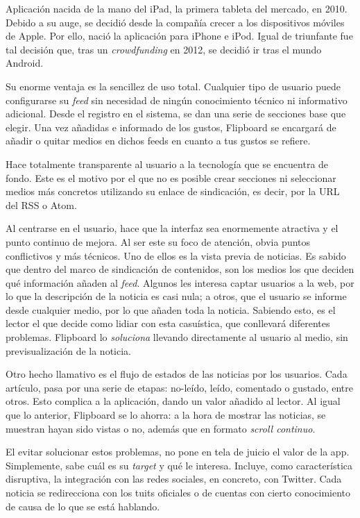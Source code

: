 Aplicación nacida de la mano del iPad, la primera tableta del mercado, en 2010. Debido a su auge, se decidió desde la compañía crecer a los dispositivos móviles de Apple. Por ello, nació la aplicación para iPhone e iPod. Igual de triunfante fue tal decisión que, tras un \textit{crowdfunding} en 2012, se decidió ir tras el mundo Android.


Su enorme ventaja es la sencillez de uso total. Cualquier tipo de usuario puede configurarse su \textit{feed} sin necesidad de ningún conocimiento técnico ni informativo adicional. Desde el registro en el sistema, se dan una serie de secciones base que elegir. Una vez añadidas e informado de los gustos, Flipboard se encargará de añadir o quitar medios en dichos feeds en cuanto a tus gustos se refiere.

Hace totalmente transparente al usuario a la tecnología que se encuentra de fondo. Este es el motivo por el que no es posible crear secciones ni seleccionar medios más concretos utilizando su enlace de sindicación, es decir, por la URL del RSS o Atom.

Al centrarse en el usuario, hace que la interfaz sea enormemente atractiva y el punto continuo de mejora. Al ser este su foco de atención, obvia puntos conflictivos y más técnicos. Uno de ellos es la vista previa de noticias. Es sabido que dentro del marco de sindicación de contenidos, son los medios los que deciden qué información añaden al \textit{feed}. Algunos les interesa captar usuarios a la web, por lo que la descripción de la noticia es casi nula; a otros, que el usuario se informe desde cualquier medio, por lo que añaden toda la noticia. Sabiendo esto, es el lector el que decide como lidiar con esta casuística, que conllevará diferentes problemas. Flipboard lo \textit{soluciona} llevando directamente al usuario al medio, sin previsualización de la noticia.

Otro hecho llamativo es el flujo de estados de las noticias por los usuarios. Cada artículo, pasa por una serie de etapas: no-leído, leído, comentado o gustado, entre otros. Esto complica a la aplicación, dando un valor añadido al lector. Al igual que lo anterior, Flipboard se lo ahorra: a la hora de mostrar las noticias, se muestran hayan sido vistas o no, además que en formato \textit{scroll continuo}.

El evitar solucionar estos problemas, no pone en tela de juicio el valor de la app. Simplemente, sabe cuál es su \textit{target} y qué le interesa. Incluye, como característica disruptiva,  la integración con las redes sociales, en concreto, con Twitter. Cada noticia se redirecciona con los tuits oficiales o de cuentas con cierto conocimiento de causa de lo que se está hablando.

